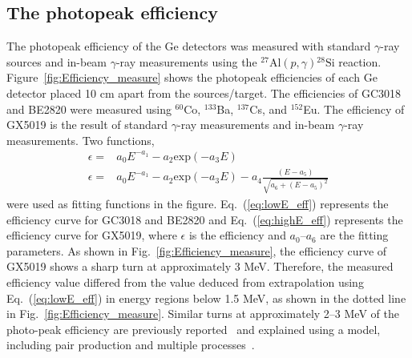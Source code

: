 \subsection{The photopeak efficiency}
\label{sec:efficiency}

The photopeak efficiency of the Ge detectors was measured with standard $\gamma$-ray sources and in-beam $\gamma$-ray measurements using the ${}^{27}\mathrm{Al}(p,\gamma){}^{28}\mathrm{Si}$ reaction.
Figure~\ref{fig:Efficiency_measure} shows the photopeak efficiencies of each Ge detector placed 10 cm apart from the sources/target.
The efficiencies of GC3018 and BE2820 were measured using $^{60}$Co, $^{133}$Ba, $^{137}$Cs, and $^{152}$Eu.
The efficiency of GX5019 is the result of standard $\gamma$-ray measurements and in-beam $\gamma$-ray measurements. %
Two functions,
\begin{align}
  \label{eq:lowE_eff}
  \epsilon =& a_0E^{-a_1}-a_2\mathrm{exp}(-a_3E) \\
  \label{eq:highE_eff}
  \epsilon =& a_0E^{-a_1}-a_2\mathrm{exp}(-a_3E)-a_4\frac{(E-a_5)}{\sqrt{a_6+(E-a_5)^2}}
\end{align}
were used as fitting functions in the figure. Eq.~(\ref{eq:lowE_eff}) represents the efficiency curve for GC3018 and BE2820 and
Eq.~(\ref{eq:highE_eff}) represents the efficiency curve for GX5019, where $\epsilon$ is the efficiency and $a_0$--$a_6$ are the fitting parameters. 
As shown in Fig.~\ref{fig:Efficiency_measure}, the efficiency curve of GX5019 shows a sharp turn at approximately 3 MeV.
Therefore, the measured efficiency value differed from the value deduced from extrapolation using Eq.~(\ref{eq:lowE_eff}) in energy regions below 1.5 MeV, as shown in the dotted line in Fig.~\ref{fig:Efficiency_measure}. 
Similar turns at approximately 2--3 MeV of the photo-peak efficiency are previously reported~\cite{Singh1971-as,McCallum1975-fy,Molnar2002-le,Elekes2003-db} and explained using a model, including pair production and multiple processes~\cite{Hajnal1974-ry}.

